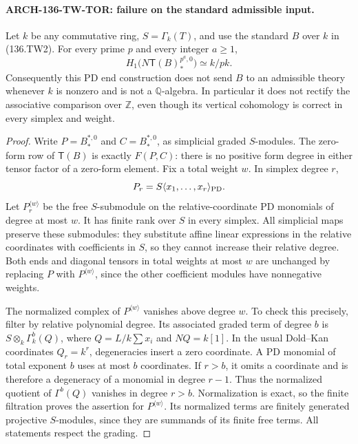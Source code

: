 \paragraph{ARCH-136-TW-TOR: failure on the standard admissible input.}
Let $k$ be any commutative ring, $S=\Gamma_k(T)$,
and use the standard $B$ over $k$ in (136.TW2).
For every prime $p$ and every integer $a\geq1$,
\[
          H_1\bigl(N\mathsf T(B)_*^{p^a,0}\bigr)
                              \simeq k/pk.               \tag{136.TO6}
\]
Consequently this PD end construction does not send
$B$ to an admissible theory whenever $k$ is nonzero
and is not a $\mathbb Q$-algebra. In particular it
does not rectify the associative comparison over
$\mathbb Z$, even though its vertical cohomology is
correct in every simplex and weight.

\begin{proof}
Write $P=B_*^{*,0}$ and $C=B_*^{*,0}$, as simplicial
graded $S$-modules. The zero-form row of $\mathsf T(B)$
is exactly $F(P,C)$: there is no positive form degree
in either tensor factor of a zero-form element.
Fix a total weight $w$. In simplex degree $r$,
\[
 P_r=S\langle x_1,\ldots,x_r\rangle_{\rm PD}.
\]
Let $P^{\langle w\rangle}_r$ be the free $S$-submodule
on the relative-coordinate PD monomials of degree at
most $w$. It has finite rank over $S$ in every simplex.
All simplicial maps preserve these submodules: they
substitute affine linear expressions in the relative
coordinates with coefficients in $S$, so they cannot
increase their relative degree. Both ends and diagonal
tensors in total weights at most $w$ are unchanged
by replacing $P$ with $P^{\langle w\rangle}$, since
the other coefficient modules have nonnegative weights.

The normalized complex of $P^{\langle w\rangle}$
vanishes above degree $w$. To check this precisely,
filter by relative polynomial degree. Its associated
graded term of degree $b$ is
$S\otimes_k\Gamma_k^b(Q)$, where
$Q=L/k\sum x_i$ and $NQ=k[1]$. In the usual
Dold--Kan coordinates $Q_r=k^r$, degeneracies insert
a zero coordinate. A PD monomial of total exponent
$b$ uses at most $b$ coordinates. If $r>b$, it
omits a coordinate and is therefore a degeneracy
of a monomial in degree $r-1$. Thus the normalized
quotient of $\Gamma^b(Q)$ vanishes in degree $r>b$.
Normalization is exact, so the finite filtration
proves the assertion for $P^{\langle w\rangle}$.
Its normalized terms are finitely generated projective
$S$-modules, since they are summands of its finite
free terms. All statements respect the grading.


\end{proof}
